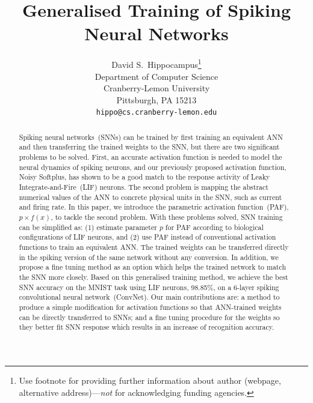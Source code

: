 \documentclass{article}
\title{Generalised Training of Spiking Neural Networks}
\author{
	David S.~Hippocampus\thanks{Use footnote for providing further
		information about author (webpage, alternative
		address)---\emph{not} for acknowledging funding agencies.} \\
	Department of Computer Science\\
	Cranberry-Lemon University\\
	Pittsburgh, PA 15213 \\
	\texttt{hippo@cs.cranberry-lemon.edu} \\
}
\begin{document}
	
	\maketitle
	
	\begin{abstract}
		Spiking neural networks~(SNNs) can be trained by first training an equivalent ANN and then transferring the trained weights to the SNN, but there are two significant problems to be solved.
		First, an accurate activation function is needed to model the neural dynamics of spiking neurons, and our previously proposed activation function, Noisy Softplus, has shown to be a good match to the response activity of Leaky Integrate-and-Fire~(LIF) neurons.
		The second problem is mapping the abstract numerical values of the ANN to concrete physical units in the SNN, such as current and firing rate.
		In this paper, we introduce the parametric activation function~(PAF), $p \times f(x)$, to tackle the second problem.
		With these problems solved, SNN training can be simplified as: (1) estimate parameter $p$ for PAF according to biological configurations of LIF neurons, and (2) use PAF instead of conventional activation functions to train an equivalent ANN.
		The trained weights can be transferred directly in the spiking version of the same network without any conversion.
		In addition, we propose a fine tuning method as an option which helps the trained network to match the SNN more closely.
		Based on this generalised training method, we achieve the best SNN accuracy on the MNIST task using LIF neurons, 98.85\%, on a 6-layer spiking convolutional neural network~(ConvNet).
		Our main contributions are: a method to produce a simple modification for activation functions so that ANN-trained weights can be directly transferred to SNNs; and a fine tuning procedure for the weights so they better fit SNN response which results in an increase of recognition accuracy.
		
		
		

\end{abstract}
\end{document}
